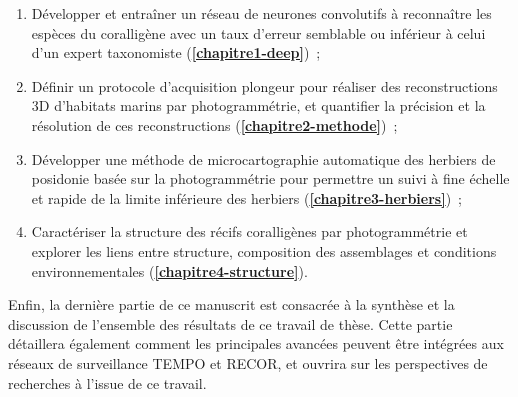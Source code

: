 \begin{enumerate}
    \item Développer et entraîner un réseau de neurones convolutifs à reconnaître les espèces du coralligène avec un taux d’erreur semblable ou inférieur à celui d’un expert taxonomiste  (\textbf{\autoref{chapitre1-deep}})~;
    
    \item Définir un protocole d’acquisition plongeur pour réaliser des reconstructions 3D d’habitats marins par photogrammétrie, et quantifier la précision et la résolution de ces reconstructions  (\textbf{\autoref{chapitre2-methode}})~;
    
    \item Développer une méthode de microcartographie automatique des herbiers de posidonie basée sur la photogrammétrie pour permettre un suivi à fine échelle et rapide de la limite inférieure des herbiers  (\textbf{\autoref{chapitre3-herbiers}})~;
    
    \item Caractériser la structure des récifs coralligènes par photogrammétrie et explorer les liens entre structure, composition des assemblages et conditions environnementales (\textbf{\autoref{chapitre4-structure}}).
    
\end{enumerate}

Enfin, la dernière partie de ce manuscrit est consacrée à la synthèse et la discussion de l’ensemble des résultats de ce travail de thèse. Cette partie détaillera également comment les principales avancées peuvent être intégrées aux réseaux de surveillance TEMPO et RECOR, et ouvrira sur les perspectives de recherches à l’issue de ce travail.